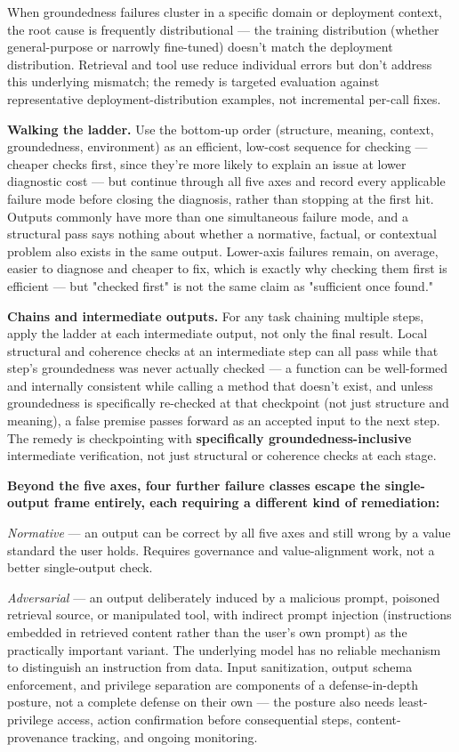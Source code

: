 When groundedness failures cluster in a specific domain or deployment context, the root cause is frequently distributional --- the training distribution (whether general-purpose or narrowly fine-tuned) doesn't match the deployment distribution. Retrieval and tool use reduce individual errors but don't address this underlying mismatch; the remedy is targeted evaluation against representative deployment-distribution examples, not incremental per-call fixes.

\textbf{Walking the ladder.} Use the bottom-up order (structure, meaning, context, groundedness, environment) as an efficient, low-cost sequence for checking --- cheaper checks first, since they're more likely to explain an issue at lower diagnostic cost --- but continue through all five axes and record every applicable failure mode before closing the diagnosis, rather than stopping at the first hit. Outputs commonly have more than one simultaneous failure mode, and a structural pass says nothing about whether a normative, factual, or contextual problem also exists in the same output. Lower-axis failures remain, on average, easier to diagnose and cheaper to fix, which is exactly why checking them first is efficient --- but "checked first" is not the same claim as "sufficient once found."

\textbf{Chains and intermediate outputs.} For any task chaining multiple steps, apply the ladder at each intermediate output, not only the final result. Local structural and coherence checks at an intermediate step can all pass while that step's groundedness was never actually checked --- a function can be well-formed and internally consistent while calling a method that doesn't exist, and unless groundedness is specifically re-checked at that checkpoint (not just structure and meaning), a false premise passes forward as an accepted input to the next step. The remedy is checkpointing with \textbf{specifically groundedness-inclusive} intermediate verification, not just structural or coherence checks at each stage.

\textbf{Beyond the five axes, four further failure classes escape the single-output frame entirely, each requiring a different kind of remediation:}

\emph{Normative} --- an output can be correct by all five axes and still wrong by a value standard the user holds. Requires governance and value-alignment work, not a better single-output check.

\emph{Adversarial} --- an output deliberately induced by a malicious prompt, poisoned retrieval source, or manipulated tool, with indirect prompt injection (instructions embedded in retrieved content rather than the user's own prompt) as the practically important variant. The underlying model has no reliable mechanism to distinguish an instruction from data. Input sanitization, output schema enforcement, and privilege separation are components of a defense-in-depth posture, not a complete defense on their own --- the posture also needs least-privilege access, action confirmation before consequential steps, content-provenance tracking, and ongoing monitoring.

